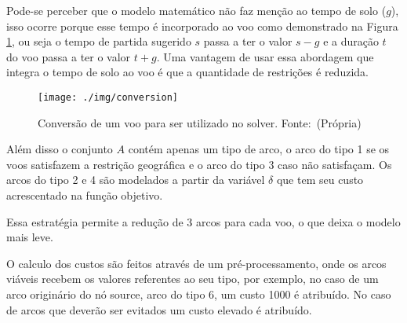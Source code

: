 \clearpage

Pode-se perceber que o modelo matemático não faz menção ao tempo de solo ($g$), isso ocorre porque esse tempo é incorporado ao voo como demonstrado na Figura \ref{fig:conversion}, ou seja o tempo de partida sugerido $s$ passa a ter o valor $s - g$ e a duração $t$ do voo passa a ter o valor $t + g$. Uma vantagem de usar essa abordagem que integra o tempo de solo ao voo é que a quantidade de restrições é reduzida.

\begin{figure}[ht]
	\centering
	\caption{Conversão de um voo para ser utilizado no
	solver. \mbox{Fonte: (Própria)}}\label{fig:conversion}
	\texttt{[image: ./img/conversion]}
	
\end{figure}

Além disso o conjunto $A$ contém apenas um tipo de arco, o arco do tipo 1 se os voos satisfazem a restrição geográfica e o arco do tipo 3 caso não satisfaçam. Os arcos do tipo 2 e 4 são modelados a partir  da variável $\delta$ que tem seu custo acrescentado na função objetivo.

Essa estratégia permite a redução de 3 arcos para cada voo, o que deixa o modelo mais leve.

O calculo dos custos são feitos através de um pré-processamento, onde os arcos viáveis recebem os valores referentes ao seu tipo, por exemplo, no caso de um arco originário do nó source, arco do tipo 6, um custo 1000 é atribuído. No caso de arcos que deverão ser evitados um custo elevado é atribuído.
  	